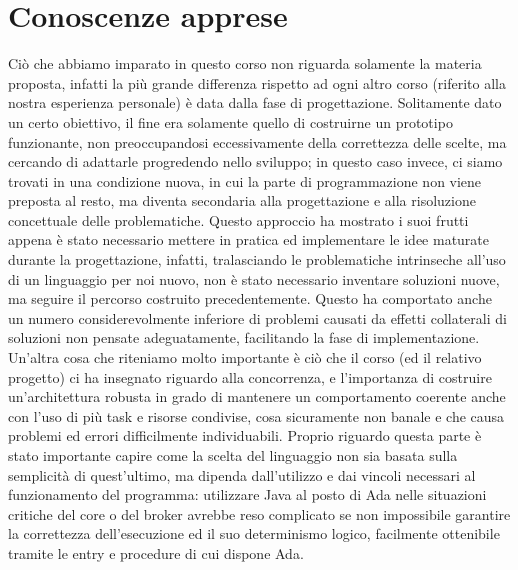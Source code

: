 
\chapter{Conoscenze apprese} %

\label{Chapter8} %


Ciò che abbiamo imparato in questo corso non riguarda solamente la materia proposta, infatti la più grande differenza rispetto ad ogni altro corso (riferito alla nostra esperienza personale) è data dalla fase di progettazione. Solitamente dato un certo obiettivo, il fine era solamente quello di costruirne un prototipo funzionante, non preoccupandosi eccessivamente della correttezza delle scelte, ma cercando di adattarle progredendo nello sviluppo; in questo caso invece, ci siamo trovati in una condizione nuova, in cui la parte di programmazione non viene preposta al resto, ma diventa secondaria alla progettazione e alla risoluzione concettuale delle problematiche. 
Questo approccio ha mostrato i suoi frutti appena è stato necessario mettere in pratica ed implementare le idee maturate durante la progettazione, infatti, tralasciando le problematiche intrinseche all’uso di un linguaggio per noi nuovo, non è stato necessario inventare soluzioni nuove, ma seguire il percorso costruito precedentemente. Questo ha comportato anche un numero considerevolmente inferiore di problemi causati da effetti collaterali di soluzioni non pensate adeguatamente, facilitando la fase di implementazione.
Un’altra cosa che riteniamo molto importante è ciò che il corso (ed il relativo progetto) ci ha insegnato riguardo alla concorrenza, e l’importanza di costruire un’architettura robusta in grado di mantenere un comportamento coerente anche con l’uso di più task e risorse condivise, cosa sicuramente non banale e che causa problemi ed errori difficilmente individuabili. Proprio riguardo questa parte è stato importante capire come la scelta del linguaggio non sia basata sulla semplicità di quest’ultimo, ma dipenda dall’utilizzo e dai vincoli necessari al funzionamento del programma: utilizzare Java al posto di Ada nelle situazioni critiche del core o del broker avrebbe reso complicato se non impossibile garantire la correttezza dell’esecuzione ed il suo determinismo logico, facilmente ottenibile tramite le entry e procedure di cui dispone Ada.
